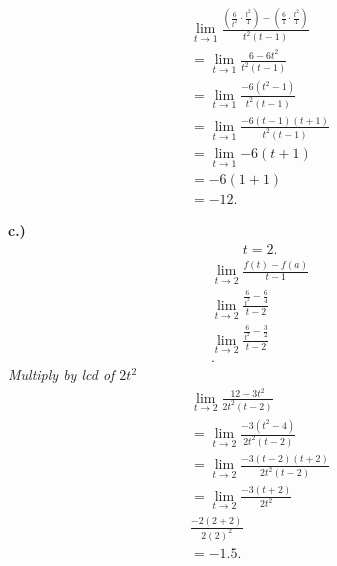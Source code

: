 \documentclass{report}
\begin{document}
    \begin{align*}
        \lim\limits_{t \to 1}{ \frac{ (\frac{6}{t^2} \cdot \frac{t^2}{1}) - (\frac{6}{1} \cdot \frac{t^2}{1})}{t^2(t-1)}} \\
        = \lim\limits_{t \to 1}{ \frac{6-6t^2}{t^2(t-1)}} \\
        = \lim\limits_{t \to 1}{ \frac{-6(t^2-1)}{t^2(t-1)}} \\
        = \lim\limits_{t \to 1}{ \frac{-6(t-1)(t+1)}{t^2(t-1)}} \\ 
        = \lim\limits_{t \to 1}{-6(t+1)} \\ 
        = -6(1+1) \\ 
        = -12
    .\end{align*}

    \bigbreak \noindent 
    \textbf{c.)} 
    \begin{align*}
        t= 2
    .\end{align*}
    \bigbreak \noindent 
    \begin{align*}
        \lim\limits_{t \to 2 }{ \frac{f(t)- f(a)}{t -1}} \\
        \lim\limits_{t \to 2}{ \frac{ \frac{6}{t^2} - \frac{6}{4}}{t-2}} \\ 
        \lim\limits_{t \to 2}{ \frac{ \frac{6}{t^2} - \frac{3}{2}}{t-2}} \\
    .\end{align*}
    \bigbreak \noindent 
    \textit{Multiply by lcd of $2t^2$} 
    \bigbreak \noindent 
    \begin{align*}
        \lim\limits_{t \to 2}{ \frac{12 - 3t^2}{2t^2(t-2)}} \\ 
        = \lim\limits_{t \to 2}{ \frac{-3(t^2-4)}{2t^2(t-2)}} \\ 
        = \lim\limits_{t \to 2}{ \frac{-3(t-2)(t+2)}{2t^2(t-2)}} \\ 
        = \lim\limits_{t \to 2}{ \frac{-3(t+2)}{2t^2}} \\
        \frac{-2(2+2)}{2(2)^2} \\ 
        = -1.5
    .\end{align*}
    
\end{document}

